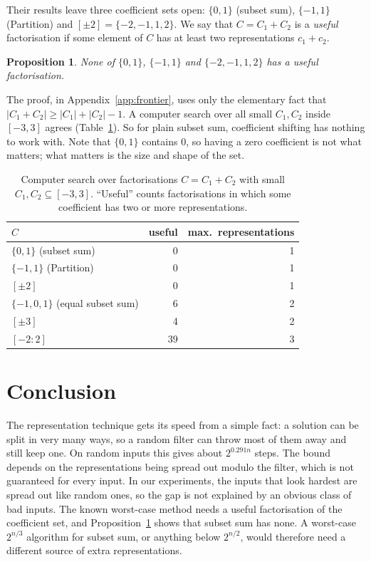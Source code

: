 \documentclass[conference]{IEEEtran}
\newtheorem{proposition}{Proposition}
\begin{document}
Their results leave three coefficient sets open: $\{0,1\}$ (subset sum),
$\{-1,1\}$ (Partition) and $[\pm2]=\{-2,-1,1,2\}$. We say that $C=C_1+C_2$ is a
\emph{useful} factorisation if some element of $C$ has at least two
representations $c_1+c_2$.

\begin{proposition}\label{prop:frontier}
None of $\{0,1\}$, $\{-1,1\}$ and $\{-2,-1,1,2\}$ has a useful factorisation.
\end{proposition}

The proof, in Appendix~\ref{app:frontier}, uses only the elementary fact that
$|C_1+C_2|\ge|C_1|+|C_2|-1$. A computer search over all small $C_1,C_2$ inside
$[-3,3]$ agrees (Table~\ref{tab:shift}). So for plain subset sum, coefficient
shifting has nothing to work with. Note that $\{0,1\}$ contains $0$, so having a
zero coefficient is not what matters; what matters is the size and shape of the
set.

\begin{table}[t]
\centering
\caption{Computer search over factorisations $C=C_1+C_2$ with small
$C_1,C_2\subseteq[-3,3]$. ``Useful'' counts factorisations in which some
coefficient has two or more representations.}
\label{tab:shift}
\begin{tabular}{lrr}
\toprule
$C$ & useful & max.\ representations \\
\midrule
$\{0,1\}$ (subset sum) & 0 & 1 \\
$\{-1,1\}$ (Partition) & 0 & 1 \\
$[\pm2]$ & 0 & 1 \\
$\{-1,0,1\}$ (equal subset sum) & 6 & 2 \\
$[\pm3]$ & 4 & 2 \\
$[-2:2]$ & 39 & 3 \\
\bottomrule
\end{tabular}
\end{table}

\section{Conclusion}
The representation technique gets its speed from a simple fact: a solution can
be split in very many ways, so a random filter can throw most of them away and
still keep one. On random inputs this gives about $2^{0.291n}$ steps. The bound
depends on the representations being spread out modulo the filter, which is not
guaranteed for every input. In our experiments, the inputs that look hardest
are spread out like random ones, so the gap is not explained by an obvious
class of bad inputs. The known worst-case method needs a useful factorisation
of the coefficient set, and Proposition~\ref{prop:frontier} shows that subset
sum has none. A worst-case $2^{n/3}$ algorithm for subset sum, or anything below
$2^{n/2}$, would therefore need a different source of extra representations.
\end{document}
